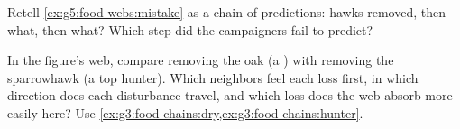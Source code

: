 \begin{exercise}[$\star\star$]\label{exo:g5:food-webs:10}
Retell \cref{ex:g5:food-webs:mistake} as a chain of
predictions: hawks removed, then what, then what? Which
step did the campaigners fail to predict?
\end{exercise}

\begin{exercise}[$\star\star\star$]\label{exo:g5:food-webs:11}
In the figure's web, compare removing the oak (a )
with removing the sparrowhawk (a top hunter). Which
neighbors feel each loss first, in which direction does
each disturbance travel, and which loss does the web absorb
more easily here? Use
\cref{ex:g3:food-chains:dry,ex:g3:food-chains:hunter}.
\end{exercise}
